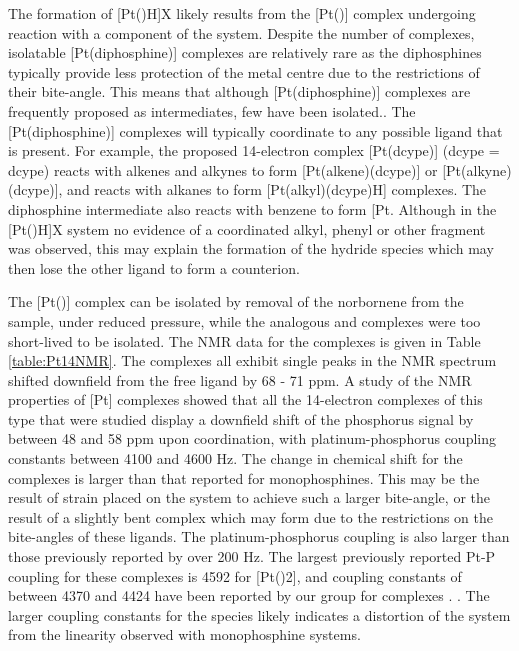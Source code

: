 The formation of [Pt(\tBuxantphosk)H]X likely results from the [Pt(\tBuxantphos)] complex undergoing reaction with a component of the system.  Despite the number of \ce{[Pt(monophosphine)2]} complexes, isolatable [Pt(diphosphine)] complexes are relatively rare as the diphosphines typically provide less protection of the metal centre due to the restrictions of their bite-angle.  This means that although [Pt(diphosphine)] complexes are frequently proposed as intermediates, few have been isolated.\cite{Clark1986b, Hackett1988, Nicolas2012}.  The [Pt(diphosphine)] complexes will typically coordinate to any possible ligand that is present.  For example, the proposed 14-electron complex [Pt(\acrshort{dcype})] (\acrshort{dcype} = \acrlong{dcype}) reacts with alkenes and alkynes to form [Pt(alkene)(dcype)] or [Pt(alkyne)(dcype)], and reacts with alkanes to form [Pt(alkyl)(dcype)H] complexes.\cite{Hackett1988}  The diphosphine intermediate also reacts with benzene to form [Pt\ce{(C6H5)(dcype)H]}.  Although in the [Pt(\tBuxantphosk)H]X system no evidence of a coordinated alkyl, phenyl or other fragment was observed, this may explain the formation of the hydride species which may then lose the other ligand to form a counterion.  

The [Pt(\tButhixantphos)] complex can be isolated by removal of the norbornene from the sample, under reduced pressure, while the analogous \tBusixantphos{} and \tBuxantphos{} complexes were too short-lived to be isolated.  The \phosphorus{} NMR data for the complexes is given in Table \ref{table:Pt14NMR}.  The complexes all exhibit single peaks in the \phosphorus{} NMR spectrum shifted downfield from the free ligand by 68 - 71 ppm.  A study of the \phosphorus{} NMR properties of [Pt] complexes showed that all the 14-electron complexes of this type that were studied display a downfield shift of the phosphorus signal by between 48 and 58 ppm upon coordination, with platinum-phosphorus coupling constants between 4100 and 4600 Hz.\cite{Mann1980}  The change in chemical shift for the \tBuxantphos{} complexes is larger than that reported for monophosphines.  This may be the result of strain placed on the system to achieve such a larger bite-angle, or the result of a slightly bent complex which may form due to the restrictions on the bite-angles of these ligands.  The platinum-phosphorus coupling is also larger than those previously reported by over 200 Hz.  The largest previously reported Pt-P coupling for these complexes is 4592 for [Pt()2], and coupling constants of between 4370 and 4424 have been reported by our group for complexes .  .  The larger coupling constants for the \tBuxantphos{} species likely indicates a distortion of the system from the linearity observed with monophosphine systems.  

